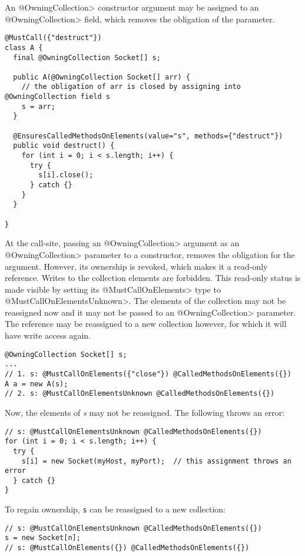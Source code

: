 An \<@OwningCollection> constructor argument may be assigned to an \<@OwningCollection> field, which removes the obligation of the parameter.

\begin{verbatim}
@MustCall({"destruct"})
class A {
  final @OwningCollection Socket[] s;

  public A(@OwningCollection Socket[] arr) {
    // the obligation of arr is closed by assigning into @OwningCollection field s
    s = arr;
  }

  @EnsuresCalledMethodsOnElements(value="s", methods={"destruct"})
  public void destruct() {
    for (int i = 0; i < s.length; i++) {
      try {
        s[i].close();
      } catch {}
    }
  }

}
\end{verbatim}

At the call-site, passing an \<@OwningCollection> argument as an \<@OwningCollection> parameter to a constructor, removes the obligation for the argument. However, its ownership is revoked, which makes it a read-only reference. Writes to the collection elements are forbidden. This read-only status is made visible by setting its \<@MustCallOnElements> type to \<@MustCallOnElementsUnknown>. The elements of the collection may not be reassigned now and it may not be passed to an \<@OwningCollection> parameter. The reference may be reassigned to a new collection however, for which it will have write access again.

\begin{verbatim}
@OwningCollection Socket[] s;
...
// 1. s: @MustCallOnElements({"close"}) @CalledMethodsOnElements({})
A a = new A(s);
// 2. s: @MustCallOnElementsUnknown @CalledMethodsOnElements({})
\end{verbatim}

Now, the elements of \textit{s} may not be reassigned. The following throws an error:

\begin{verbatim}
// s: @MustCallOnElementsUnknown @CalledMethodsOnElements({})
for (int i = 0; i < s.length; i++) {
  try {
    s[i] = new Socket(myHost, myPort);  // this assignment throws an error
  } catch {}
}
\end{verbatim}

To regain ownership, \texttt{s} can be reassigned to a new collection:

\begin{verbatim}
// s: @MustCallOnElementsUnknown @CalledMethodsOnElements({})
s = new Socket[n];
// s: @MustCallOnElements({}) @CalledMethodsOnElements({})
\end{verbatim}

